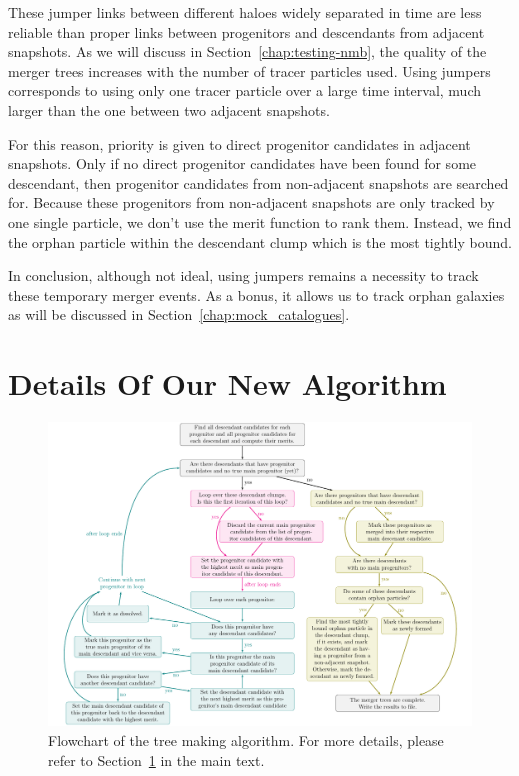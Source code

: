 These jumper links between different haloes widely separated in time
are less reliable than proper links between progenitors and
descendants from adjacent snapshots.  As we will discuss
in Section~\ref{chap:testing-nmb}, the quality of the merger trees
increases with the number of tracer particles used.  Using jumpers
corresponds to using only one tracer particle over a large time interval,
much larger than the one between two adjacent snapshots.

For this reason, priority is given to direct progenitor candidates in
adjacent snapshots.  Only if no direct progenitor candidates have been
found for some descendant, then progenitor candidates from
non-adjacent snapshots are searched for.  Because these progenitors
from non-adjacent snapshots are only tracked by one single particle,
we don't use the merit function to rank them.  Instead, we find the
orphan particle within the descendant clump which is the most tightly
bound.

In conclusion, although not ideal, using jumpers remains a necessity
to track these temporary merger events.  As a bonus, it allows us to
track orphan galaxies as will be discussed in
Section~\ref{chap:mock_catalogues}.





\section{Details Of Our New Algorithm}\label{chap:my_code}

\begin{figure}
	\includegraphics[width=\textwidth]{./images/tikz/tree_algorithm_flowchart.pdf}%
	\caption{\label{fig:flowchart}
    	Flowchart of the tree making algorithm. For more details, please refer to Section~\ref{chap:my_code} in the main text.
  }
\end{figure}

